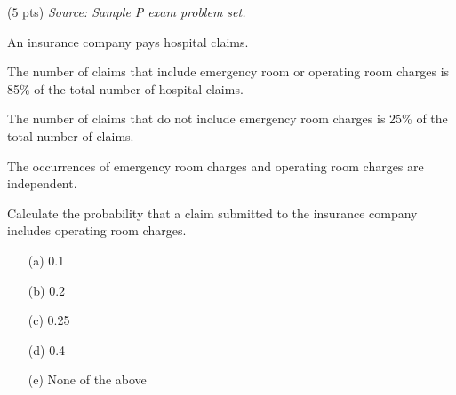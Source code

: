 \documentclass[reqno,letterpaper, onsided,10pt]{amsart}
\theoremstyle{definition}
\newcommand{\sol}[1]{\par\noindent{\bf Solution:} #1}
\renewcommand{\sol}[1]{}
\begin{document}
\medskip

\begin{problem} ($5$ pts) %
{\em Source: Sample P exam problem set.}

An insurance company pays hospital claims. 

The number of claims that include emergency room or operating room charges is 85\% of the total number of hospital claims. 

The number of claims that do not include emergency room charges is 25\% of the total number of claims. 

The occurrences of emergency room charges and operating room charges are independent. 

Calculate the probability that a claim submitted to the insurance company includes operating room charges. 
\begin{itemize}
\item[(a)] 0.1
\vskip0.1cm
\item[(b)] 0.2
\vskip0.1cm
\item[(c)] 0.25
\vskip0.1cm
\item[(d)] 0.4
\vskip0.1cm
\item[(e)] None of the above
\end{itemize}
\end{problem}

\sol{{\bf (d)}\\
Let us denote by $E$ the event that a given claim includes emergency room charges and 
by $O$ the event that it includes operating room charges. Then, we can formalize the data provided in the problem as 
\begin{equation}%
    \nonumber 
    \begin{split}
      \PP[E \cup O] & = 0.85\\
      \PP[E^c] & = 0.25 \, \Rightarrow \, \PP[E] = 0.75\\
      \PP[E \cap O] & = \PP[E] \PP[O]. 
    \end{split}
\end{equation}
We need to find $\PP[O]$. 

From the first equality above, we get 
\begin{equation}%
    \nonumber 
    \begin{split}
      0.85 = \PP[E \cup O] = \PP[E] + \PP[O] - \PP[E \cap O]. 
    \end{split}
\end{equation}
Then, using the second qnd third equalities,  
\begin{equation}%
    \nonumber 
    \begin{split}
        0.85 = \PP[E \cup O] = 0.75 + \PP[O] - 0.75 \PP[O]. 
    \end{split}
\end{equation}
So, $\PP[O] = 0.1 /0.25 = 0.4.$
}
\end{document}
